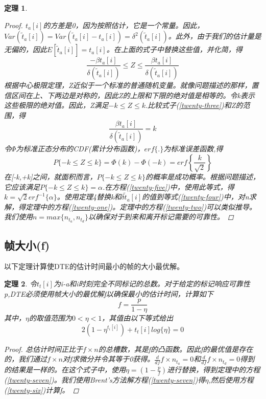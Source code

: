 \documentclass[UTF8]{ctexart}
\newtheorem{theorem}{定理}
\newtheorem*{proof}{证明}
\begin{document}
\begin{theorem}
\begin{proof}
		$t_a[i]$的方差是0，因为按照估计，它是一个常量。因此，$Var(\widetilde{t}_a[i])=Var(\widetilde{t}_a[i]-t_a[i])=\delta^2(\widetilde{t}_a[i])$。此外，由于我们的估计量是无偏的，因此$E[\widetilde{t}_a[i]]=t_a[i]$。在上面的式子中替换这些值，并化简，得
		\begin{equation}\label{twenty-three}
		\frac{-\beta t_a[i]}{\delta(\widetilde{t}_a[i])}\le Z \le \frac{\beta t_a[i]}{\delta(\widetilde{t}_a[i])}
		\end{equation}
		根据中心极限定理，Z近似于一个标准的普通随机变量。就像问题描述的那样，置信区间在上、下两边是对称的，因此Z的上限和下限的绝对值是相等的。令k表示这些极限的绝对值。因此，Z满足$-k\le Z\le k.$比较式子(\ref{twenty-three})和Z的范围，得
		\begin{equation}\label{twenty-four}
		\frac{\beta t_a[i]}{\delta(\widetilde{t}_a[i])}=k
		\end{equation}
		令$\Phi$为标准正态分布的CDF(累计分布函数)，$erf\{.\}$为标准误差函数,得
		\begin{equation}\label{twenty-five}
		P\{-k\le Z\le k\} = \Phi(k)-\Phi(-k)=erf\left\{\frac{k}{\sqrt{2}}\right\}
		\end{equation}
		在[-k,+k]之间，就面积而言，$P\{-k \le Z \le k\}$的概率是成功概率。根据问题描述，它应该满足$P\{-k \le Z \le k\}=\alpha$.在方程(\ref{twenty-five})中，使用此等式，得$k=\sqrt{2}erf^{-1}\{\alpha\}$。使用定理4替换k和$\delta{\widetilde{t}_a[i]}$的值到等式(\ref{twenty-four})中，对n求解，得定理中的方程(\ref{twenty-one})。定理中的方程(\ref{twenty-two})可以类似推导。我们使用$n=max\{n_{t_a},n_{t_d}\}$以确保对于到来和离开标记需要的可靠性。
	\end{proof}
\end{theorem}
\subsection{帧大小(f)}

以下定理计算使DTE的估计时间最小的帧的大小最优解。
\begin{theorem}
	令$t_t[i]$为i-a和i时刻完全不同标记的总数。对于给定的标记响应可靠性p,DTE必须使用帧大小的最优解f以确保最小的估计时间，计算如下
	\begin{equation}\label{twenty-six}
	f = \frac{p}{1-\eta}
	\end{equation}
	其中，$\eta$的取值范围为$0 < \eta < 1$，其值由以下等式给出
	\begin{equation}\label{twenty-seven}
	2(1-\eta^{t_i[i]})+t_t[i]log\{\eta\}=0
	\end{equation}
	\begin{proof}
		总估计时间正比于$f\times n$的总槽数，其是f的凸函数。因此f的最优值是存在的，我们通过$f\times n$对f求微分并令其等于0获得。$\frac{d}{df}f\times n_{t_a}=0$和$\frac{d}{df}f\times n_{t_d}=0$得到的结果是一样的。在这个式子中，使用$\eta=(1-\frac{p}{f})$进行替换，得到定理中的方程(\ref{twenty-seven})。我们使用Brent's方法解方程(\ref{twenty-seven})得$\eta$,然后使用方程(\ref{twenty-six})计算f。
	\end{proof}
\end{theorem}
\end{document}
